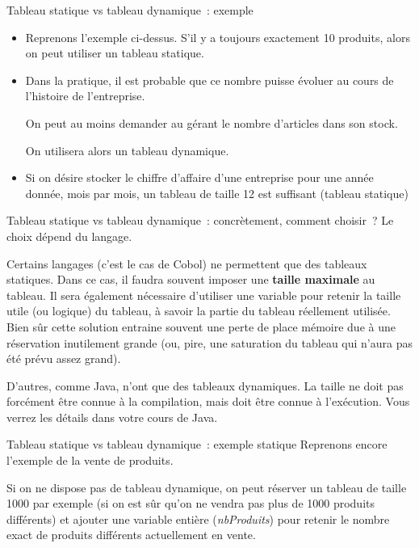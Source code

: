 \begin{frame}{Tableau statique vs tableau dynamique~: exemple}
	\begin{itemize}
	\item
		Reprenons l’exemple ci-dessus. 
		S’il y a toujours exactement 10 produits, 
		alors on peut utiliser un tableau statique. 
	\item
		Dans la pratique, il est probable que ce nombre puisse évoluer 
		au cours de l’histoire de l’entreprise.
		
		On peut au moins demander au gérant le nombre d'articles dans son stock.
		
		On utilisera alors un tableau dynamique.
	\item 
		Si on désire stocker le chiffre d’affaire d’une entreprise 
		pour une année donnée, mois par mois, un tableau de
		taille 12 est suffisant (tableau statique)
	\end{itemize}
\end{frame}

\begin{frame}{Tableau statique vs tableau dynamique~: concrètement, comment choisir~?}
	Le choix dépend du langage.

	Certains langages (c’est le cas de Cobol) ne permettent 
	que des tableaux statiques. Dans ce cas, il faudra souvent
	imposer une \textbf{taille maximale} au tableau. 
	Il sera également nécessaire d’utiliser une variable 
	pour retenir la taille utile (ou logique) du tableau, 
	à savoir la partie du tableau réellement utilisée.
	Bien sûr cette solution entraine souvent une perte de place mémoire due
	à une réservation inutilement grande (ou, pire, une saturation du
	tableau qui n’aura pas été prévu assez grand).
	
	\bigskip
	
	D'autres, comme Java, n'ont que des tableaux dynamiques. La taille ne doit 
	pas forcément être connue à la compilation, mais doit être connue à
	l'exécution. Vous verrez les détails dans votre cours de Java.
\end{frame}

\begin{frame}{Tableau statique vs tableau dynamique~: exemple statique}
	Reprenons encore l’exemple de la vente de produits. 
	
	Si on ne dispose pas de tableau dynamique, on peut réserver
	un tableau de taille 1000 par exemple (si on est sûr qu’on ne vendra
	pas plus de 1000 produits différents) et ajouter une variable entière
	(\textit{nbProduits}) pour retenir 
	le nombre exact de produits différents actuellement en vente.
\end{frame}

